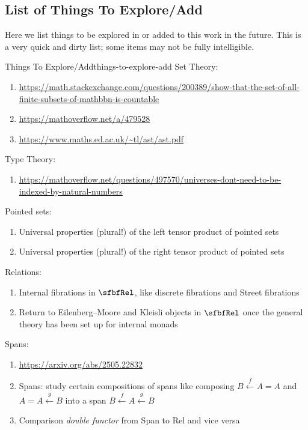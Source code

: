 \subsection{List of Things To Explore/Add}\label{subsection-things-to-explore-add}
Here we list things to be explored in or added to this work in the future. This is a very quick and dirty list; some items may not be fully intelligible.
\begin{remark}{Things To Explore/Add}{things-to-explore-add}%
    Set Theory:
    \begin{enumerate}
        \item \url{https://math.stackexchange.com/questions/200389/show-that-the-set-of-all-finite-subsets-of-mathbbn-is-countable}
        \item \url{https://mathoverflow.net/a/479528}
        \item \url{https://www.maths.ed.ac.uk/~tl/ast/ast.pdf}
    \end{enumerate}
    Type Theory:
    \begin{enumerate}
        \item \url{https://mathoverflow.net/questions/497570/universes-dont-need-to-be-indexed-by-natural-numbers}
    \end{enumerate}
    Pointed sets:
    \begin{enumerate}
        \item Universal properties (plural!) of the left tensor product of pointed sets
        \item Universal properties (plural!) of the right tensor product of pointed sets
    \end{enumerate}
    Relations:
    \begin{enumerate}
        \item Internal fibrations in $\sfbfRel$, like discrete fibrations and Street fibrations
        \item Return to Eilenberg--Moore and Kleisli objects in $\sfbfRel$ once the general theory has been set up for internal monads
    \end{enumerate}
    Spans:
    \begin{enumerate}
        \item \url{https://arxiv.org/abs/2505.22832}
        \item Spans: study certain compositions of spans like composing $B\xleftarrow{f}A=A$ and $A=A\xleftarrow{g}B$ into a span $B\xleftarrow{f}A\xleftarrow{g}B$
        \item Comparison \emph{double functor} from Span to Rel and vice versa

\end{enumerate}
\end{remark}
